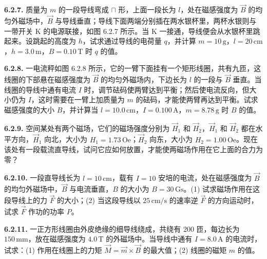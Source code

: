 \vfill
\newpage

\textbf{6.2.7.} 质量为 $m$ 的一段导线弯成 $\sqcap$ 形，上面一段长为 $l$，处在磁感强度为 $\vec{B}$ 的均匀外磁场中，$\vec{B}$ 与导线垂直；导线下面两端分别插在两水银杯里，两杯水银则与一带开关 $\mathrm{K}$ 的电源联接，如图 6.2.7 所示。当 $\mathrm{K}$ 一接通，导线便会从水银杯里跳起来。设跳起的高度为 $h$，试求通过导线的电荷量 $q$，并计算 $m = 10\,\mathrm{g}$，$l = 20\,\mathrm{cm}$，$h = 3.0\,\mathrm{m}$，$B = 0.10\,\mathrm{T}$ 时 $q$ 的值。

\begin{center}
\end{center}

\vfill
\newpage

\textbf{6.2.8.} 一电流秤如图 6.2.8 所示，它的一臂下面挂有一个矩形线圈，共有九匝，这线圈的下部悬在磁感强度为 $\vec{B}$ 的均匀外磁场内，下边长为 $l$ 的一段与 $\vec{B}$ 垂直。当线圈的导线中通有电流 $I$ 时，调节砝码使两臂达到平衡；然后使电流反向，但大小仍为 $I$，这时需要在一臂上加质量为 $m$ 的砝码，才能使两臂再达到平衡。试求磁感强度的大小 $B$，并计算当 $l = 10.0\,\mathrm{cm}$，$I = 0.100\,\mathrm{A}$，$m = 8.78\,\mathrm{g}$ 时 $B$ 的值。

\begin{center}
\end{center}

\vfill
\newpage

\textbf{6.2.9.} 空间某处有两个磁场，它们的磁场强度分别为 $\vec{H}_{1}$ 和 $\vec{H}_{2}$，$\vec{H}_{1}$ 和 $\vec{H}_{2}$ 都在水平方向，$\vec{H}_{1}$ 向北，大小为 $H_{1} = 1.73\,\mathrm{Oe}$；$\vec{H}_{2}$ 向东，大小为 $H_{2} = 1.00\,\mathrm{Oe}$。现在该处有一段载流直导线，试问它应如何放置，才能使两磁场作用在它上面的合力为零？

\vfill
\newpage

\textbf{6.2.10.} 一段直导线长为 $l = 10\,\mathrm{cm}$，载有 $I = 10$ 安培的电流，处在磁感强度为 $\vec{B}$ 的均匀外磁场中，$\vec{B}$ 与电流垂直，$B$ 的大小为 $B = 30\,\mathrm{Gs}$。(1) 试求磁场作用在这段导线上的力 $\vec{F}$ 的大小；(2) 当这段导线以 $25\,\mathrm{cm/s}$ 的速率逆 $\vec{F}$ 的方向运动时，试求 $\vec{F}$ 作功的功率 $P$。

\vfill
\newpage

\textbf{6.2.11.} 一正方形线圈由外皮绝缘的细导线绕成，共绕有 $200$ 匝，每边长为 $150\,\mathrm{mm}$，放在磁感强度为 $4.0\,\mathrm{T}$ 的外磁场中。当导线中通有 $I = 8.0\,\mathrm{A}$ 的电流时，试求：(1) 作用在线圈上的力矩 $\vec{M} = \vec{m} \times \vec{B}$ 的最大值；(2) 线圈的磁矩 $m$ 的值。

